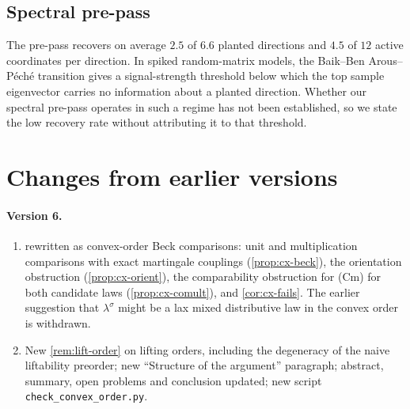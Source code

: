 \documentclass[11pt]{article}
\theoremstyle{definition}
\theoremstyle{remark}
\newcommand{\ls}{\lambda^{\sigma}}
\begin{document}
\subsection{Spectral pre-pass}
The pre-pass recovers on average $2.5$ of $6.6$ planted directions and $4.5$ of $12$ active
coordinates per direction. In spiked random-matrix models, the Baik--Ben Arous--P\'ech\'e transition
\cite{BBP2005} gives a signal-strength threshold below which the top sample eigenvector carries no
information about a planted direction. Whether our spectral pre-pass operates in such a regime has
not been established, so we state the low recovery rate without attributing it to that threshold.

\section{Changes from earlier versions}\label{app:changes}

\paragraph{Version 6.}
\begin{enumerate}[leftmargin=*,label=(\alph*)]
\item {} rewritten as convex-order Beck comparisons: unit and multiplication comparisons
  with exact martingale couplings (\cref{prop:cx-beck}), the orientation obstruction
  (\cref{prop:cx-orient}), the comparability obstruction for (Cm) for both candidate laws
  (\cref{prop:cx-comult}), and \cref{cor:cx-fails}. The earlier suggestion that $\ls$ might be a lax
  mixed distributive law in the convex order is withdrawn.
\item New \cref{rem:lift-order} on lifting orders, including the degeneracy of the naive liftability
  preorder; new ``Structure of the argument'' paragraph; abstract, summary, open problems and
  conclusion updated; new script \texttt{check\_convex\_order.py}.
\end{enumerate}
\end{document}
